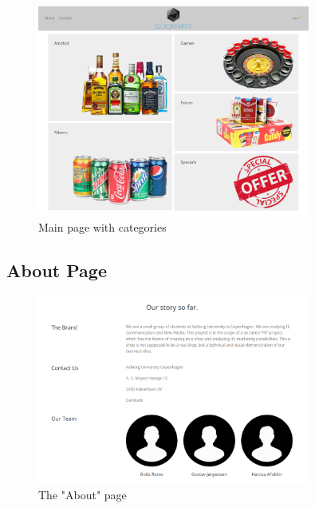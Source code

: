 \documentclass[12p]{article}
\begin{document}
\begin{figure}[ht]
    \centering
    \includegraphics[width=0.8\textwidth]{main_page}
    \caption{Main page with categories}
    \label{fig:main_page}
\end{figure}


\subsection{About Page}

\begin{figure}[H]
    \centering
    \includegraphics[width=0.8\textwidth]{about_page}
    \caption{The "About" page}
    \label{fig:about_page}
\end{figure}
\end{document}
